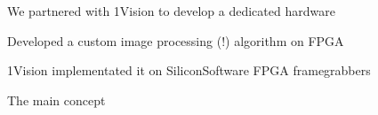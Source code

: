 \begin{frame}[label=real-9]{We partnered with 1Vision to develop a dedicated hardware}
    \centering{}
\end{frame}


\begin{frame}[label=real-10]{Developed a custom image processing (!) algorithm on FPGA}
    \centering{}
    \end{frame}

    \begin{frame}[label=real-11]{1Vision implementated it on SiliconSoftware FPGA framegrabbers}
\end{frame}

\begin{frame}[label=real-12]{The main concept}
    \centering{}
\end{frame}

%